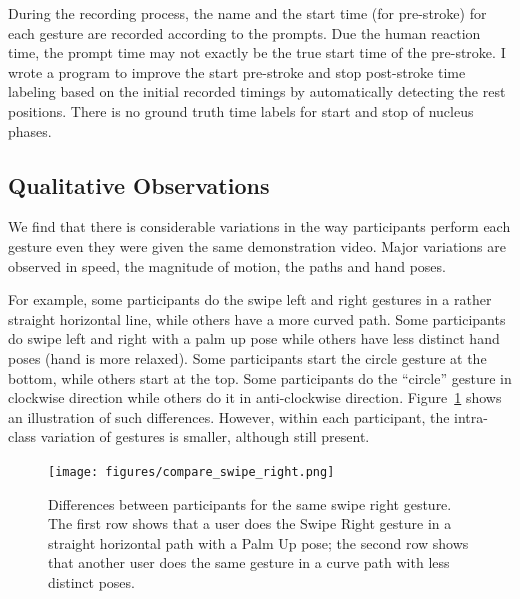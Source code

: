 During the recording process, the name and the start time (for pre-stroke) for
each gesture are recorded according to the prompts. Due the human reaction time,
the prompt time may not exactly be the true start time of the pre-stroke. I wrote a program to improve the
start pre-stroke and stop post-stroke time labeling based on the initial
recorded timings by automatically detecting the rest positions. There is no
ground truth time labels for start and stop of nucleus phases.

\subsection{Qualitative Observations}\label{sec:qualitative-observation}
We find that there is considerable variations in the way participants perform
each gesture even they were given the same demonstration video. Major variations
are observed in speed, the magnitude of motion, the paths and hand poses.

For example, some participants do the swipe left and right gestures in a rather
straight horizontal line, while others have a more curved path.  Some
participants do swipe left and right with a palm up pose while others have
less distinct hand poses (hand is more relaxed). Some participants start
the circle gesture at the bottom, while others start at the top. Some
participants do the ``circle'' gesture in clockwise direction while others do it
in anti-clockwise direction. Figure~\ref{fig:compare-swipe-right} shows
an illustration of such differences. However, within each participant, the
intra-class variation of gestures is smaller, although still present.

\begin{figure}[tbh]
\centering
\texttt{[image: figures/compare\_swipe\_right.png]}
\caption{Differences between participants for the same swipe right gesture. 
The first row shows that a user does the Swipe Right gesture in a straight
horizontal path with a Palm Up pose; the second row shows that another user
does the same gesture in a curve path with less distinct poses.}
\label{fig:compare-swipe-right}
\end{figure}

